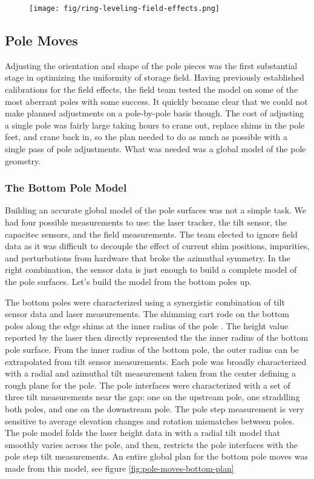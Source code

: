 \begin{figure}
\texttt{[image: fig/ring-leveling-field-effects.png]}
\label{fig:ring-leveling-field-effects}
\end{figure}

\subsection{Pole Moves}

Adjusting the orientation and shape of the pole pieces was the first substantial stage in optimizing the uniformity of \gmtwo storage field.  Having previously established calibrations for the field effects,  the field team tested the model on some of the most aberrant poles with some success.  It quickly became clear that we could not make planned adjustments on a pole-by-pole basis though.  The cost of adjusting a single pole was fairly large taking hours to crane out, replace shims in the pole feet, and crane back in, so the plan needed to do as much as possible with a single pass of pole adjustments.  What was needed was a global model of the pole geometry.

\subsubsection{The Bottom Pole Model}

Building an accurate global model of the pole surfaces was not a simple task.  We had four possible measurements to use: the laser tracker, the tilt sensor, the capacitec sensors, and the field measurements.  The team elected to ignore field data as it was difficult to decouple the effect of current shim positions, impurities, and perturbations from hardware that broke the azimuthal symmetry.  In the right combination, the sensor data is just enough to build a complete model of the pole surfaces.  Let's build the model from the bottom poles up.

The bottom poles were characterized using a synergistic combination of tilt sensor data and laser measurements.  The shimming cart rode on the bottom poles along the edge shims at the inner radius of the pole . The height value reported by the laser then directly represented the the inner radius of the bottom pole surface.  From the inner radius of the bottom pole, the outer radius can be extrapolated from tilt sensor measurements.  Each pole was broadly characterized with a radial and azimuthal tilt measurement taken from the center defining a rough plane for the pole.  The pole interfaces were characterized with a set of three tilt measurements near the gap: one on the upstream pole, one straddling both poles, and one on the downstream pole.  The pole step measurement is very sensitive to average elevation changes and rotation mismatches between poles.  The pole model folds the laser height data in with a radial tilt model that smoothly varies across the pole, and then, restricts the pole interfaces with the pole step tilt measurements.  An entire global plan for the bottom pole moves was made from this model, see figure \ref{fig:pole-moves-bottom-plan}

